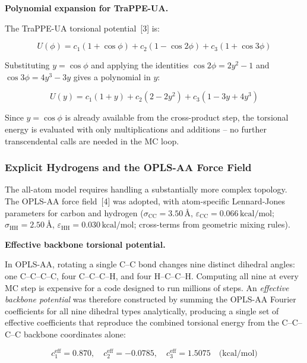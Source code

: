 \textbf{Polynomial expansion for TraPPE-UA.}

The TraPPE-UA torsional potential~[3] is:

\begin{equation}
  U(\phi) = c_1(1+\cos\phi) + c_2(1-\cos 2\phi) + c_3(1+\cos 3\phi)
\end{equation}

Substituting $y = \cos\phi$ and applying the identities
$\cos 2\phi = 2y^2-1$ and $\cos 3\phi = 4y^3-3y$ gives a polynomial
in $y$:

\begin{equation}
  U(y) = c_1(1+y) + c_2(2-2y^2) + c_3(1-3y+4y^3)
\end{equation}

Since $y = \cos\phi$ is already available from the cross-product step,
the torsional energy is evaluated with only multiplications and
additions -- no further transcendental calls are needed in the MC loop.

\subsubsection{Explicit Hydrogens and the OPLS-AA Force Field}

The all-atom model requires handling a substantially more complex
topology. The OPLS-AA force field~[4] was adopted, with atom-specific
Lennard-Jones parameters for carbon and hydrogen
($\sigma_\mathrm{CC}=3.50\,\text{\AA}$,
$\varepsilon_\mathrm{CC}=0.066\,\text{kcal/mol}$;
$\sigma_\mathrm{HH}=2.50\,\text{\AA}$,
$\varepsilon_\mathrm{HH}=0.030\,\text{kcal/mol}$; cross-terms from
geometric mixing rules).

\textbf{Effective backbone torsional potential.}

In OPLS-AA, rotating a single C--C bond changes nine distinct dihedral
angles: one C--C--C--C, four C--C--C--H, and four H--C--C--H. Computing
all nine at every MC step is expensive for a code designed to run
millions of steps. An \emph{effective backbone potential} was therefore
constructed by summing the OPLS-AA Fourier coefficients for all nine
dihedral types analytically, producing a single set of effective
coefficients that reproduce the combined torsional energy from the
C--C--C--C backbone coordinates alone:

\begin{equation}
  c_1^\mathrm{eff} = 0.870,\quad
  c_2^\mathrm{eff} = -0.0785,\quad
  c_3^\mathrm{eff} = 1.5075 \quad \text{(kcal/mol)}
\end{equation}


